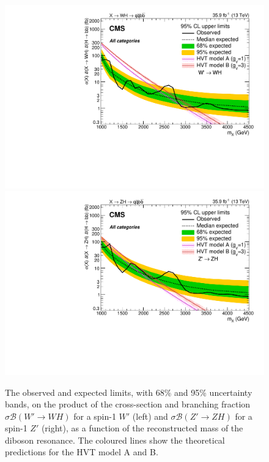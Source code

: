 \begin{figure}[!htb]
  \centering
    \includegraphics[width=.495\textwidth]{figures/B2G-17-002/CMS-B2G-17-002_Figure_005-a.pdf}%
    \includegraphics[width=.495\textwidth]{figures/B2G-17-002/CMS-B2G-17-002_Figure_005-b.pdf}
  \caption{The observed and expected limits, with 68\% and 95\% uncertainty bands, on the product of the cross-section and branching fraction $\sigma \mathcal{B} (W' \rightarrow WH)$ for a spin-1 $W'$ (left) and $\sigma \mathcal{B} (Z' \rightarrow ZH)$ for a spin-1 $Z'$ (right), as a function of the reconstructed mass of the diboson resonance. The coloured lines show the theoretical predictions for the HVT model A and B.~\cite{CMS:2017eme,bib:CMS-PAS-B2G-17-002}}
  \label{fig:theory_B2G-17-002}
\end{figure}

